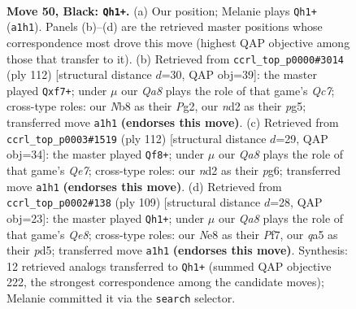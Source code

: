 \documentclass[11pt]{article}
\begin{document}
\clearpage

\begin{figure}[p]\centering
\begin{subfigure}{0.46\textwidth}\centering
\resizebox{\linewidth}{!}{%
\newchessgame
\chessboard[
  setfen={1n2n3/4k3/7p/Q7/P7/7K/3N4/q7 b - - 0 50},
  showmover=false,
  pgfstyle=straightmove, color=movearrow, markmove={a1-h1}
]}
\caption{}
\end{subfigure}\hfill
\begin{subfigure}{0.46\textwidth}\centering
\resizebox{\linewidth}{!}{%
\newchessgame
\chessboard[
  setfen={8/2Q2p1k/8/1q4p1/8/8/6PK/8 w - - 0 57},
  showmover=false,
  pgfstyle=straightmove, color=movearrow, markmove={c7-f7}
]}
\caption{}
\end{subfigure}
\\[4pt]
\begin{subfigure}{0.46\textwidth}\centering
\resizebox{\linewidth}{!}{%
\newchessgame
\chessboard[
  setfen={8/4Q3/6pk/4p3/4q3/6PK/8/8 w - - 2 57},
  showmover=false,
  pgfstyle=straightmove, color=movearrow, markmove={e7-f8}
]}
\caption{}
\end{subfigure}\hfill
\begin{subfigure}{0.46\textwidth}\centering
\resizebox{\linewidth}{!}{%
\newchessgame
\chessboard[
  setfen={8/5pk1/Q2p4/P2P4/8/5K2/8/4q3 b - - 8 55},
  showmover=false,
  pgfstyle=straightmove, color=movearrow, markmove={e1-h1}
]}
\caption{}
\end{subfigure}
\caption{\textbf{Move 50, Black: \texttt{Qh1+}.} (a) Our position; Melanie plays \texttt{Qh1+} (\texttt{a1h1}). Panels (b)--(d) are the retrieved master positions whose correspondence most drove this move (highest QAP objective among those that transfer to it). (b) Retrieved from \texttt{ccrl\_top\_p0000\#3014} (ply 112) [structural distance $d$=30, QAP obj=39]: the master played \texttt{Qxf7+}; under $\mu$ our \emph{Qa8} plays the role of that game's \emph{Qc7}; cross-type roles: our \emph{N}b8 as their \emph{P}g2, our \emph{n}d2 as their \emph{p}g5; transferred move \texttt{a1h1} \textbf{(endorses this move)}. (c) Retrieved from \texttt{ccrl\_top\_p0003\#1519} (ply 112) [structural distance $d$=29, QAP obj=34]: the master played \texttt{Qf8+}; under $\mu$ our \emph{Qa8} plays the role of that game's \emph{Qe7}; cross-type roles: our \emph{n}d2 as their \emph{p}g6; transferred move \texttt{a1h1} \textbf{(endorses this move)}. (d) Retrieved from \texttt{ccrl\_top\_p0002\#138} (ply 109) [structural distance $d$=28, QAP obj=23]: the master played \texttt{Qh1+}; under $\mu$ our \emph{Qa8} plays the role of that game's \emph{Qe8}; cross-type roles: our \emph{N}e8 as their \emph{P}f7, our \emph{q}a5 as their \emph{p}d5; transferred move \texttt{a1h1} \textbf{(endorses this move)}. Synthesis: 12 retrieved analogs transferred to \texttt{Qh1+} (summed QAP objective 222, the strongest correspondence among the candidate moves); Melanie committed it via the \texttt{search} selector.}
\label{fig:thought-m99}
\end{figure}
\end{document}
